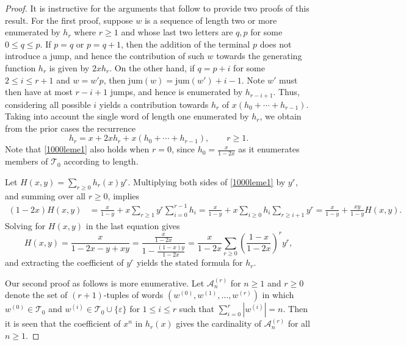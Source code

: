 \documentclass{article}
\theoremstyle{remark}
\theoremstyle{plain}
\begin{document}
\begin{proof}
It is instructive for the arguments that follow to provide two proofs of this result.  For the first proof, suppose $w$ is a sequence of length two or more enumerated by $h_r$ where $r \geq 1$ and whose last two letters are $q,p$ for some $0 \leq q \leq p$.  If $p=q$ or $p=q+1$, then the addition of the terminal $p$ does not introduce a jump, and hence the contribution of such $w$ towards the generating function $h_r$ is given by $2xh_r$.  On the other hand, if $q=p+i$ for some $2 \leq i \leq r+1$ and $w=w'p$, then $\text{jum}(w)=\text{jum}(w')+i-1$.  Note $w'$ must then have at most $r-i+1$ jumps, and hence is enumerated by $h_{r-i+1}$.  Thus, considering all possible $i$ yields a contribution towards $h_r$ of $x(h_0+\cdots+h_{r-1})$.  Taking into account the single word of length one enumerated by $h_r$, we obtain from the prior cases the recurrence
\begin{equation}\label{1000leme1}
h_r=x+2xh_r+x(h_0+\cdots+h_{r-1}), \qquad r \geq 1.
\end{equation}
Note that \eqref{1000leme1} also holds when $r=0$, since $h_0=\frac{x}{1-2x}$ as it enumerates members of $\mathcal{T}_0$ according to length.

Let $H(x,y)=\sum_{r\geq0}h_r(x)y^r$.  Multiplying both sides of \eqref{1000leme1} by $y^r$, and summing over all $r \geq0$, implies
\begin{align*}
(1-2x)H(x,y)&=\frac{x}{1-y}+x\sum_{r\geq1}y^r\sum_{i=0}^{r-1}h_i=\frac{x}{1-y}+x\sum_{i\geq0}h_i\sum_{r \geq i+1}y^r=\frac{x}{1-y}+\frac{xy}{1-y}H(x,y).
\end{align*}
Solving for $H(x,y)$ in the last equation gives
$$H(x,y)=\frac{x}{1-2x-y+xy}=\frac{\frac{x}{1-2x}}{1-\frac{(1-x)y}{1-2x}}=\frac{x}{1-2x}\sum_{r \geq0}\left(\frac{1-x}{1-2x}\right)^ry^r,$$
and extracting the coefficient of $y^r$ yields the stated formula for $h_r$.

Our second proof as follows is more enumerative.  Let $\mathcal{A}_n^{(r)}$ for $n \geq 1$ and $r \geq0$ denote the set of $(r+1)$-tuples of words $(w^{(0)},w^{(1)},\ldots,w^{(r)})$ in which $w^{(0)} \in \mathcal{T}_0$ and $w^{(i)} \in \mathcal{T}_0\cup\{\varepsilon\}$ for $1 \leq i \leq r$ such that $\sum_{i=0}^r|w^{(i)}|=n$.
Then it is seen that the coefficient of $x^n$ in $h_r(x)$ gives the cardinality of $\mathcal{A}_n^{(r)}$ for all $n \geq 1$.


\end{proof}
\end{document}
